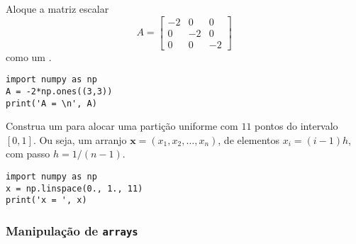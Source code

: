 \begin{exer}
  Aloque a matriz escalar
  \begin{equation}
      A = \begin{bmatrix}
        -2 & 0 & 0\\
        0 & -2 & 0\\
        0 & 0 & -2
      \end{bmatrix}
  \end{equation}  
como um {\PYTHONnumpyDOTarray}.
\end{exer}
\begin{resp}
  
\begin{lstlisting}
import numpy as np
A = -2*np.ones((3,3))
print('A = \n', A)
\end{lstlisting}

\end{resp}

\begin{exer}
  Construa um {\PYTHONnumpyDOTarray} para alocar uma partição uniforme com $11$ pontos do intervalo $[0, 1]$. Ou seja, um arranjo $\pmb{x} = (x_1, x_2, \dotsc, x_n)$, de elementos $x_i = (i-1)h$, com passo $h = 1/(n-1)$. 
\end{exer}
\begin{resp}
  
\begin{lstlisting}
import numpy as np
x = np.linspace(0., 1., 11)
print('x = ', x)
\end{lstlisting}

\end{resp}

\subsubsection{Manipulação de \texttt{arrays}}


